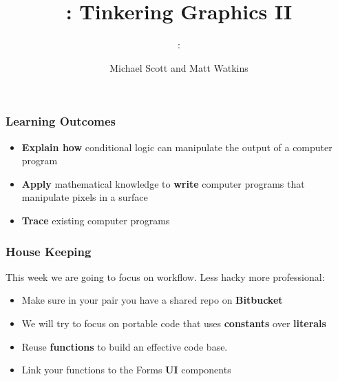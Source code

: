 	\usepackage{../../beamerthemeFalmouthGamesAcademy}
\usepackage{multimedia}
\graphicspath{ {../../} }


\usepackage[normalem]{ulem}
\usepackage{wasysym}

\usepackage{pdfpages}

\usetikzlibrary{arrows,automata}

\title{\sessionnumber: Tinkering Graphics II}
\subtitle{\modulecode: \moduletitle}
\author{Michael Scott and Matt Watkins}



{\tiny }


\maketitle

\begin{frame}
	\frametitle{Learning Outcomes}
	\begin{itemize}
		\item \textbf{Explain how} conditional logic can manipulate the output of a computer program
		\item \textbf{Apply} mathematical knowledge to \textbf{write} computer programs that manipulate pixels in a surface
		\item \textbf{Trace} existing computer programs
	\end{itemize}
\end{frame}

\begin{frame}
	\frametitle{House Keeping}
	
	This week we are going to focus on workflow. Less hacky more professional:
	
	\begin{itemize}		
		\item Make sure in your pair you have a shared repo on \textbf{Bitbucket}
		\item We will try to focus on portable code that uses \textbf{constants} over \textbf{literals}
		\item Reuse \textbf{functions} to build an effective code base.
		\item Link your functions to the Forms \textbf{UI} components
	
	\end{itemize}
\end{frame}

